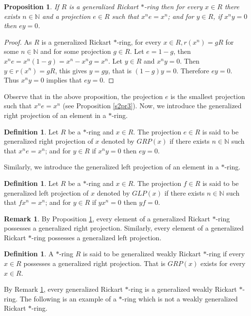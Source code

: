 \documentclass[11pt, one side,emlines]{amsart}
\newtheorem{proposition}[lemma]{Proposition}
\theoremstyle{definition}
\newtheorem{remark}[lemma]{Remark}
\newtheorem{definition}[lemma]{Definition}
\numberwithin{equation}{section} \thispagestyle{empty} \voffset
\begin{document}
\begin{proposition} \label{s2pr2} If $R$ is a generalized  Rickart $*$-ring then for every $ x \in R $ there exists $ n\in\mathbb{N} $ and a projection $ e\in R$ such that $x^ne=x^n$; and for $y \in R$, if $x^ny=0$ then $ey=0 $.
\end{proposition}		 
\begin{proof} As $R$ is a  generalized  Rickart $ *$-ring,
	for every $ x\in R, r(x^n)=gR $ for some $ n\in\mathbb{N}$ and for some projection  $g\in R $.
	Let $ e=1-g $, then $x^ne=x^n(1-g)=x^n-x^ng=x^n$. Let $y\in R$ and $ x^ny=0 $. 
  Then	$y\in r(x^n)=gR$, this gives $ y=gy$, that is $(1-g)y=0$. Therefore $ey=0$.
	Thus $ x^ny=0$ implies that $ey=0 $.
\end{proof}

Observe that in the above proposition, the projection $e$ is the smallest projection such that  $ x^ne=x^n$ (see Proposition \ref{s2pr3}).
Now, we introduce the generalized right projection of an element in a $*$-ring.
\begin{definition}  Let $R$ be a $*$-ring and $ x \in R $. The projection $ e \in R $ is said to be generalized right projection of $x$ denoted by $GRP(x)$ if there exists $ n\in\mathbb{N} $ such that  $ x^ne=x^n$; and for $y\in R$ if $x^ny=0$ then $ey=0$. 
	\end{definition}
  Similarly, we introduce the generalized left projection of an element in a $*$-ring.
 \begin{definition}  Let $R$ be a $*$-ring and $ x \in R $. The projection $ f \in R $ is said to be generalized left projection of $x$ denoted by $GLP(x)$ if there exists $ n\in\mathbb{N} $ such that  $ fx^n=x^n$; and for $y\in R$ if $yx^n=0$ then $yf=0$. 
 \end{definition} 
  
 \begin{remark}  \label{s2rm1}	By Proposition \ref{s2pr2}, every element of a generalized Rickart $*$-ring possesses a generalized right projection.
   Similarly, every element of a generalized Rickart $*$-ring possesses a generalized left projection. 	
  \end{remark}
  
\begin{definition}  A $*$-ring $R$ is said to be generalized weakly Rickart $*$-ring  if every $x\in R$ possesses a generalized right projection. That is $GRP(x)$ exists for every $ x \in R $.
\end{definition}
     By Remark \ref{s2rm1}, every generalized Rickart $*$-ring is a generalized weakly Rickart $*$-ring. The following is an example of a $*$-ring which is not a weakly generalized Rickart $*$-ring.
   
\end{document}
